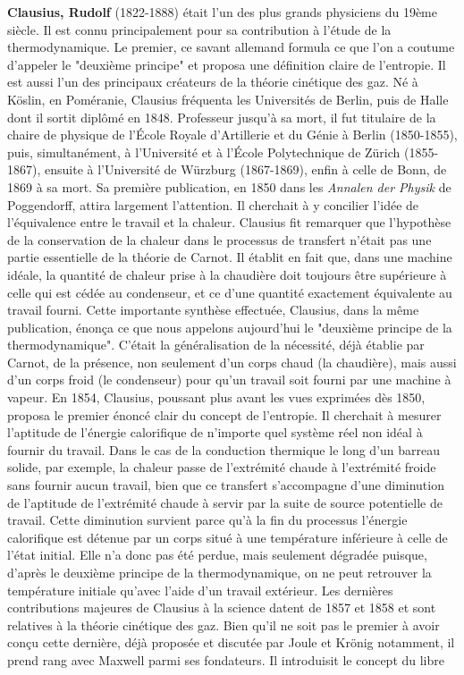 \textbf{Clausius, Rudolf} (1822-1888) était l'un des plus grands physiciens du 19ème siècle. Il est connu principalement pour sa contribution à l'étude de la thermodynamique. Le premier, ce savant allemand formula ce que l'on a coutume d'appeler le "deuxième principe" et proposa une définition claire de l'entropie. Il est aussi l'un des principaux créateurs de la théorie cinétique des gaz. Né à Köslin, en Poméranie, Clausius fréquenta les Universités de Berlin, puis de Halle dont il sortit diplômé en 1848. Professeur jusqu'à sa mort, il fut titulaire de la chaire de physique de l'École Royale d'Artillerie et du Génie à Berlin (1850-1855), puis, simultanément, à l'Université et à l'École Polytechnique de Zürich (1855-1867), ensuite à l'Université de Würzburg (1867-1869), enfin à celle de Bonn, de 1869 à sa mort. Sa première publication, en 1850 dans les \textit{Annalen der Physik} de Poggendorff, attira largement l'attention. Il cherchait à y concilier l'idée de l'équivalence entre le travail et la chaleur. Clausius fit remarquer que l'hypothèse de la conservation de la chaleur dans le processus de transfert n'était pas une partie essentielle de la théorie de Carnot. Il établit en fait que, dans une machine idéale, la quantité de chaleur prise à la chaudière doit toujours être supérieure à celle qui est cédée au condenseur, et ce d'une quantité exactement équivalente au travail fourni. Cette importante synthèse effectuée, Clausius, dans la même publication, énonça ce que nous appelons aujourd'hui le "deuxième principe de la thermodynamique". C'était la généralisation de la nécessité, déjà établie par Carnot, de la présence, non seulement d'un corps chaud (la chaudière), mais aussi d'un corps froid (le condenseur) pour qu'un travail soit fourni par une machine à vapeur. En 1854, Clausius, poussant plus avant les vues exprimées dès 1850, proposa le premier énoncé clair du concept de l'entropie. Il cherchait à mesurer l'aptitude de l'énergie calorifique de n'importe quel système réel non idéal à fournir du travail. Dans le cas de la conduction thermique le long d'un barreau solide, par exemple, la chaleur passe de l'extrémité chaude à l'extrémité froide sans fournir aucun travail, bien que ce transfert s'accompagne d'une diminution de l'aptitude de l'extrémité chaude à servir par la suite de source potentielle de travail. Cette diminution survient parce qu'à la fin du processus l'énergie calorifique est détenue par un corps situé à une température inférieure à celle de l'état initial. Elle n'a donc pas été perdue, mais seulement dégradée puisque, d'après le deuxième principe de la thermodynamique, on ne peut retrouver la température initiale qu'avec l'aide d'un travail extérieur. Les dernières contributions majeures de Clausius à la science datent de 1857 et 1858 et sont relatives à la théorie cinétique des gaz. Bien qu'il ne soit pas le premier à avoir conçu cette dernière, déjà proposée et discutée par Joule et Krönig notamment, il prend rang avec Maxwell parmi ses fondateurs. Il introduisit le concept du libre 